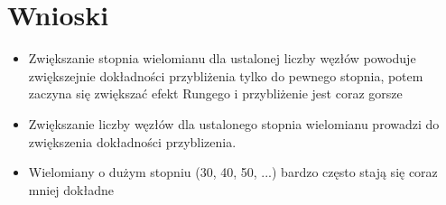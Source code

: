 \documentclass{article}
\begin{document}
\newpage

\section{Wnioski}

\begin{itemize}
\item Zwiększanie stopnia wielomianu dla ustalonej liczby węzłów powoduje zwiększejnie dokładności przybliżenia tylko do pewnego stopnia, potem zaczyna się zwiększać efekt Rungego i przybliżenie jest coraz gorsze
\item Zwiększanie liczby węzłów dla ustalonego stopnia wielomianu prowadzi do zwiększenia dokładności przyblizenia.
\item Wielomiany o dużym stopniu (30, 40, 50, ...) bardzo często stają się coraz mniej dokładne
\end{itemize}
\end{document}
